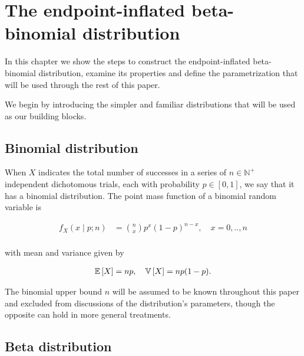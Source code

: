 \chapter{The endpoint-inflated beta-binomial distribution}
\label{cap:distribution}

In this chapter we show the steps to construct the endpoint-inflated beta-binomial distribution, examine its properties and define the parametrization that will be used through the rest of this paper.

We begin by introducing the simpler and familiar distributions that will be used as our building blocks.

\section{Binomial distribution}
\label{sec:bino-dist}

When $X$ indicates the total number of successes in a series of $n \in \mathbb{N}^+$ independent dichotomous trials, each with probability $p \in [0,1]$, we say that it has a binomial distribution. The point mass function of a binomial random variable is

\begin{equation}
\label{binomial-pmf}
\begin{split}
f_{X}(x \mid p; n)
&= \binom{n}{x}p^x(1-p)^{n-x},\quad x=0,..,n\\
\end{split}
\end{equation}

with mean and variance given by

\begin{equation}
\label{binomial-meanvar}
\begin{split}
{\mathbb E}\left[ X \right] = np, \quad {\mathbb V}\left[ X \right] = np(1-p).
\end{split}
\end{equation}

The binomial upper bound $n$ will be assumed to be known throughout this paper and excluded from discussions of the distribution's parameters, though the opposite can hold in more general treatments.

\section{Beta distribution}
\label{sec:beta-dist}

